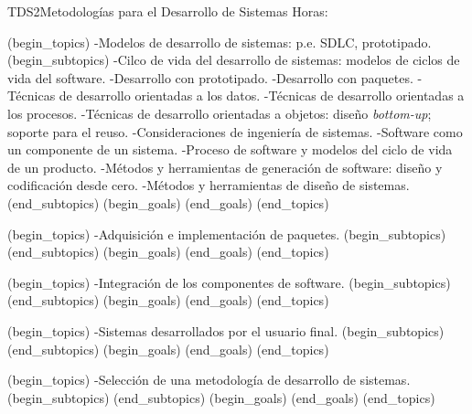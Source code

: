 \begin{BKL2}{TDS2}{Metodologías para el Desarrollo de Sistemas}
Horas:
 
(begin_topics)
-Modelos de desarrollo de sistemas: p.e. SDLC, prototipado.
(begin_subtopics)
-Cilco de vida del desarrollo de sistemas: modelos de ciclos de vida del software.
-Desarrollo con prototipado.
-Desarrollo con paquetes.
-Técnicas de desarrollo orientadas a los datos.
-Técnicas de desarrollo orientadas a los procesos.
-Técnicas de desarrollo orientadas a objetos: diseño \textit{bottom-up}; soporte para el reuso.
-Consideraciones de ingeniería de sistemas.
-Software como un componente de un sistema.
-Proceso de software y modelos del ciclo de vida de un producto.
-Métodos y herramientas de generación de software: diseño y codificación desde cero.
-Métodos y herramientas de diseño de sistemas.
(end_subtopics)
(begin_goals)
(end_goals)
(end_topics)

 
(begin_topics)
-Adquisición e implementación de paquetes.
(begin_subtopics)
(end_subtopics)
(begin_goals)
(end_goals)
(end_topics)

 
(begin_topics)
-Integración de los componentes de software.
(begin_subtopics)
(end_subtopics)
(begin_goals)
(end_goals)
(end_topics)

 
(begin_topics)
-Sistemas desarrollados por el usuario final.
(begin_subtopics)
(end_subtopics)
(begin_goals)
(end_goals)
(end_topics)

 
(begin_topics)
-Selección de una metodología de desarrollo de sistemas.
(begin_subtopics)
(end_subtopics)
(begin_goals)
(end_goals)
(end_topics)

\end{BKL2}



